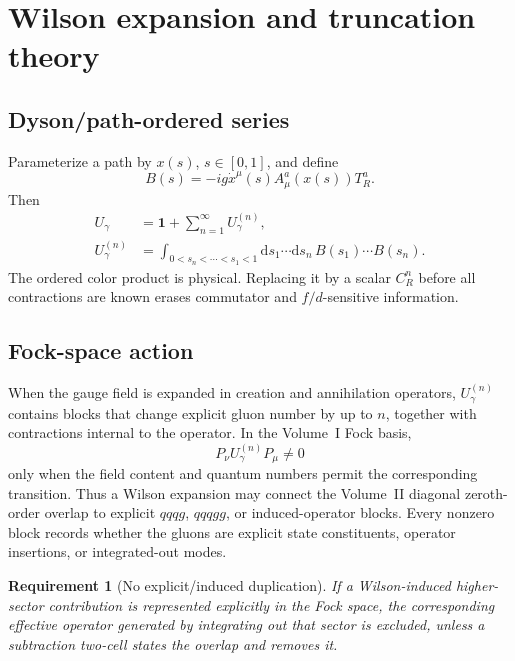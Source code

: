 \documentclass[11pt]{article}
\newtheorem{requirement}[definition]{Requirement}
\newcommand{\dd}{\mathrm{d}}
\newcommand{\bbone}{\bm 1}
\begin{document}
\section{Wilson expansion and truncation theory}
\label{sec:wilson-expansion}

\subsection{Dyson/path-ordered series}

Parameterize a path by \(x(s)\), \(s\in[0,1]\), and define
\begin{equation}
 B(s)=-ig\dot x^\mu(s)A_\mu^a(x(s))T_R^a.
\label{eq:path-generator}
\end{equation}
Then
\begin{align}
 U_\gamma
 &=\bbone+\sum_{n=1}^{\infty}U_\gamma^{(n)},
\label{eq:dyson-series}\\
 U_\gamma^{(n)}
 &=\int_{0<s_n<\cdots<s_1<1}
 \dd s_1\cdots\dd s_n\,
 B(s_1)\cdots B(s_n).
\label{eq:dyson-term}
\end{align}
The ordered color product is physical.  Replacing it by a scalar
\(C_R^n\) before all contractions are known erases commutator and
\(f/d\)-sensitive information.

\subsection{Fock-space action}

When the gauge field is expanded in creation and annihilation operators,
\(U_\gamma^{(n)}\) contains blocks that change explicit gluon number by up to
\(n\), together with contractions internal to the operator.  In the Volume~I
Fock basis,
\begin{equation}
 P_\nu U_\gamma^{(n)}P_\mu\neq0
\label{eq:wilson-fock-block}
\end{equation}
only when the field content and quantum numbers permit the corresponding
transition.  Thus a Wilson expansion may connect the Volume~II diagonal
zeroth-order overlap to explicit \(qqqg\), \(qqqgg\), or induced-operator
blocks.  Every nonzero block records whether the gluons are explicit state
constituents, operator insertions, or integrated-out modes.

\begin{requirement}[No explicit/induced duplication]
\label{req:no-explicit-induced-duplication}
If a Wilson-induced higher-sector contribution is represented explicitly in
the Fock space, the corresponding effective operator generated by integrating
out that sector is excluded, unless a subtraction two-cell states the overlap
and removes it.
\end{requirement}
\end{document}
